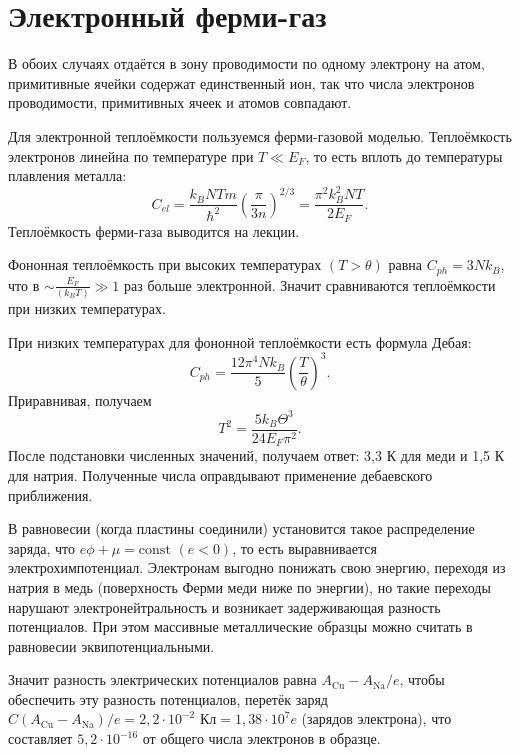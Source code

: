 \documentclass[a4paper]{article}
\begin{document}
\section{Электронный ферми-газ}
\begin{hiProb}[3.44]
\end{hiProb}
\begin{sol}
В обоих случаях отдаётся в зону проводимости
по одному электрону на атом, примитивные 
ячейки содержат единственный ион, так что
числа электронов проводимости, примитивных
ячеек и атомов совпадают.

Для электронной теплоёмкости пользуемся ферми-газовой
моделью. Теплоёмкость электронов линейна по температуре
при $T \ll E_F$, то есть вплоть до температуры
плавления металла:
\[
	C_{el}= \frac{k_B N T m}{\hbar ^2}
	\left( \frac{\pi}{3n} \right) ^{2 /3}=
	\frac{\pi^2 k_B ^2 NT}{2E_F}
.\] 
Теплоёмкость ферми-газа выводится на лекции.

Фононная теплоёмкость при высоких температурах $(T>\theta)$ равна $C_{ph}= 3 N k_B$, что в 
$\sim \frac{E_F}{(k_B T)}\gg 1$ раз больше
электронной. Значит сравниваются теплоёмкости
при низких температурах.

При низких температурах для фононной теплоёмкости
есть формула Дебая:
\[
	C_{ph}= \frac{12 \pi^4 N k_B}{5} \left( \frac{T}{\theta} \right) ^3
.\] 
Приравнивая, получаем
\[
T^2= \frac{5 k_B \Theta^3}{24 E_F \pi^2}
.\] 
После подстановки численных значений, получаем
ответ: 3,3 К для меди и 1,5 К для натрия.
Полученные числа оправдывают применение дебаевского
приближения.
\end{sol}
\begin{hiProb}[3.53]
\end{hiProb}
\begin{sol}
	В равновесии (когда пластины соединили)
	установится такое распределение заряда, что
	$e\phi +\mu = \mathrm{const}$ $(e<0)$,
	то есть выравнивается электрохимпотенциал.
	Электронам выгодно понижать свою энергию,
	переходя из натрия в медь (поверхность Ферми
	меди ниже по энергии), но такие переходы
	нарушают электронейтральность и
	возникает задерживающая разность
	потенциалов. При этом массивные металлические
	образцы можно считать в равновесии
	эквипотенциальными.

	Значит разность электрических потенциалов
	равна $A_{\mathrm{Cu}}-A_{\mathrm{Na}} /e$,
	чтобы обеспечить эту разность потенциалов,
	перетёк заряд $C(A_{\mathrm{Cu}}-A_{\operatorname{Na}}) /e=2,2 \cdot 10^{-2} \text{ Кл}=1,38
	\cdot 10^7 e$ (зарядов электрона),
	что составляет $5,2 \cdot 10^{-16}$ 
	от общего числа электронов в образце.
\end{sol}
\end{document}
